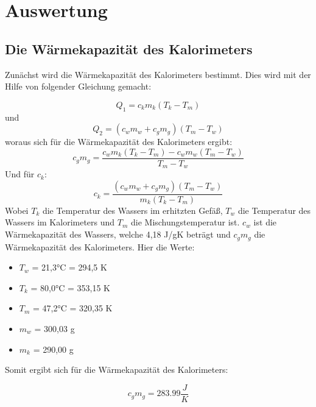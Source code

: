 \newpage
\section{Auswertung}
\label{sec:Auswertung}

\subsection{Die Wärmekapazität des Kalorimeters}

Zunächst wird die Wärmekapazität des Kalorimeters bestimmt. Dies wird mit der Hilfe von folgender Gleichung gemacht:

\begin{equation}
    Q_1 = c_km_k(T_k-T_m)
\end{equation}
und 
\begin{equation}
    Q_2 = (c_wm_w+c_gm_g)(T_m-T_w)
\end{equation}
woraus sich für die Wärmekapazität des Kalorimeters ergibt:
\begin{equation}
    c_gm_g = \frac{c_wm_k(T_k-T_m)-c_wm_w(T_m-T_w)}{T_m-T_w}
    \label{eq:cgmg}
\end{equation}
Und für \(c_k\):
\begin{equation}
    c_k = \frac{(c_wm_w+c_gm_g)(T_m-T_w)}{m_k(T_k-T_m)}
    \label{eq:ck}
\end{equation}
Wobei \(T_k\) die Temperatur des Wassers im erhitzten Gefäß, \(T_w\) die Temperatur des Wassers im Kalorimeters und \(T_m\) die Mischungstemperatur ist. \(c_w\) ist die Wärmekapazität des Wassers, welche 4,18 J/gK beträgt und \(c_gm_g\) die Wärmekapazität des Kalorimeters.
Hier die Werte:
\begin{itemize}
  \centering
  \item[] \(T_w\) = 21,3°C = 294,5 K\\
  \item[] \(T_k\) = 80,0°C = 353,15 K\\
  \item[] \(T_m\) = 47,2°C = 320,35 K\\
  \item[] \(m_w\) = 300,03 g\\
  \item[] \(m_k\) = 290,00 g\\ 
\end{itemize}
Somit ergibt sich für die Wärmekapazität des Kalorimeters:

\begin{equation}
    c_gm_g = 283.99 \frac{J}{K}
\end{equation}
\newpage
